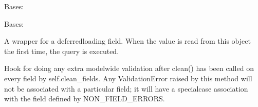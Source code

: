 \documentclass[letterpaper,10pt,english]{sphinxmanual}
\begin{document}
\begin{fulllineitems}
\begin{description}
\begin{itemize}
\end{itemize}

\end{description}

\begin{fulllineitems}
\label{\detokenize{payments:payments.models.Payment.DoesNotExist}}
\pysigstartsignatures
\pysigline
{}
\pysigstopsignatures
\sphinxAtStartPar
Bases: 

\end{fulllineitems}


\begin{fulllineitems}
\label{\detokenize{payments:payments.models.Payment.MultipleObjectsReturned}}
\pysigstartsignatures
\pysigline
{}
\pysigstopsignatures
\sphinxAtStartPar
Bases: 

\end{fulllineitems}


\begin{fulllineitems}
\label{\detokenize{payments:id0}}
\pysigstartsignatures
\pysigline
{}
\pysigstopsignatures
\sphinxAtStartPar
A wrapper for a deferred\sphinxhyphen{}loading field. When the value is read from this
object the first time, the query is executed.

\end{fulllineitems}


\begin{fulllineitems}
\label{\detokenize{payments:payments.models.Payment.clean}}
\pysigstartsignatures
\pysiglinewithargsret
{}
{}
{}
\pysigstopsignatures
\sphinxAtStartPar
Hook for doing any extra model\sphinxhyphen{}wide validation after clean() has been
called on every field by self.clean\_fields. Any ValidationError raised
by this method will not be associated with a particular field; it will
have a special\sphinxhyphen{}case association with the field defined by NON\_FIELD\_ERRORS.


\end{fulllineitems}
\end{fulllineitems}
\end{document}
